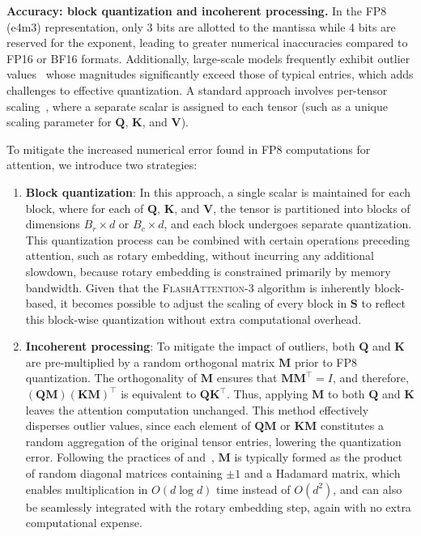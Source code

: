 \begin{enumerate}
\begin{algorithm}[H]
\begin{algorithmic}[1]
\textbf{Accuracy: block quantization and incoherent processing.} In the FP8 (e4m3) representation, only 3 bits are allotted to the mantissa while 4 bits are reserved for the exponent, leading to greater numerical inaccuracies compared to FP16 or BF16 formats. Additionally, large-scale models frequently exhibit outlier values~\citep{dettmers2208llm, sun2024massive} whose magnitudes significantly exceed those of typical entries, which adds challenges to effective quantization. A standard approach involves per-tensor scaling~\citep{micikevicius2022fp8}, where a separate scalar is assigned to each tensor (such as a unique scaling parameter for $\mathbf{Q}$, $\mathbf{K}$, and $\mathbf{V}$). 

To mitigate the increased numerical error found in FP8 computations for attention, we introduce two strategies:

\begin{enumerate}

\item \textbf{Block quantization}: In this approach, a single scalar is maintained for each block, where for each of $\mathbf{Q}$, $\mathbf{K}$, and $\mathbf{V}$, the tensor is partitioned into blocks of dimensions $B_r \times d$ or $B_c \times d$, and each block undergoes separate quantization. This quantization process can be combined with certain operations preceding attention, such as rotary embedding, without incurring any additional slowdown, because rotary embedding is constrained primarily by memory bandwidth. Given that the \textsc{FlashAttention-3} algorithm is inherently block-based, it becomes possible to adjust the scaling of every block in $\mathbf{S}$ to reflect this block-wise quantization without extra computational overhead.

\item \textbf{Incoherent processing}: To mitigate the impact of outliers, both $\mathbf{Q}$ and $\mathbf{K}$ are pre-multiplied by a random orthogonal matrix $\mathbf{M}$ prior to FP8 quantization. The orthogonality of $\mathbf{M}$ ensures that $\mathbf{M} \mathbf{M}^\top = I$, and therefore, $(\mathbf{Q} \mathbf{M}) (\mathbf{K} \mathbf{M})^\top$ is equivalent to $\mathbf{Q} \mathbf{K}^\top$. Thus, applying $\mathbf{M}$ to both $\mathbf{Q}$ and $\mathbf{K}$ leaves the attention computation unchanged. This method effectively disperses outlier values, since each element of $\mathbf{Q} \mathbf{M}$ or $\mathbf{K} \mathbf{M}$ constitutes a random aggregation of the original tensor entries, lowering the quantization error. Following the practices of \citet{chee2024quip} and~\citet{tseng2024quip}, $\mathbf{M}$ is typically formed as the product of random diagonal matrices containing $\pm 1$ and a Hadamard matrix, which enables multiplication in $O(d \log d)$ time instead of $O(d^2)$, and can also be seamlessly integrated with the rotary embedding step, again with no extra computational expense.
\end{enumerate}


\end{algorithmic}
\end{algorithm}
\end{enumerate}
